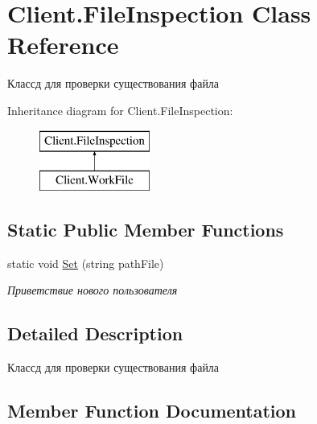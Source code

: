 \hypertarget{class_client_1_1_file_inspection}{}\section{Client.\+File\+Inspection Class Reference}
\label{class_client_1_1_file_inspection}


Классд для проверки существования файла  


Inheritance diagram for Client.\+File\+Inspection\+:\begin{figure}[H]
\begin{center}
\leavevmode
\includegraphics[height=2.000000cm]{class_client_1_1_file_inspection}
\end{center}
\end{figure}
\subsection*{Static Public Member Functions}
\begin{DoxyCompactItemize}
\item 
static void \hyperlink{class_client_1_1_file_inspection_a10b45d302a1a339e008f14b66f071889}{Set} (string path\+File)
\begin{DoxyCompactList}\small\item\em Приветствие нового пользователя \end{DoxyCompactList}\end{DoxyCompactItemize}


\subsection{Detailed Description}
Классд для проверки существования файла 



\subsection{Member Function Documentation}
\hypertarget{class_client_1_1_file_inspection_a10b45d302a1a339e008f14b66f071889}{}\label{class_client_1_1_file_inspection_a10b45d302a1a339e008f14b66f071889} 
